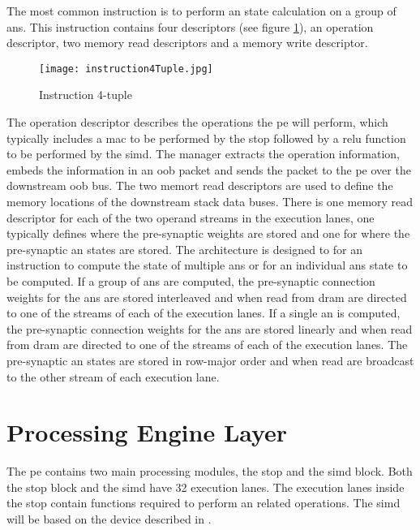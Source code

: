 The most common instruction is to perform \ac{an} state calculation on a group of \acp{an}.
This instruction contains four descriptors (see figure \ref{fig:Instruction 4-tuple}), an operation descriptor, two memory read descriptors and a memory write descriptor.
\begin{figure}[!t]
\centering
\captionsetup{justification=centering}
\captionsetup{width=.9\linewidth}
\centerline{
\mbox{\texttt{[image: instruction4Tuple.jpg]}}
}
\caption{Instruction 4-tuple}
\label{fig:Instruction 4-tuple}
\end{figure}


The operation descriptor describes the operations the \ac{pe} will perform, which typically includes a \ac{mac} to be performed by the \ac{stop} followed by a \ac{relu} function to be performed by the \ac{simd}.
The manager extracts the operation information, embeds the information in an \ac{oob} packet and sends the packet to the \ac{pe} over the downstream \ac{oob} bus.
The two memort read descriptors are used to define the memory locations of the downstream stack data buses. 
There is one memory read descriptor for each of the two operand streams in the execution lanes, one typically defines where the pre-synaptic weights are stored and one for where the pre-synaptic \ac{an} states are stored.
The architecture is designed to for an instruction to compute the state of multiple \acp{an} or for an individual \acp{an} state to be computed.
If a group of \acp{an} are computed, the pre-synaptic connection weights for the \acp{an} are stored interleaved and when read from \ac{dram} are directed to one of the streams of each of the execution lanes.
If a single \ac{an} is computed, the pre-synaptic connection weights for the \acp{an} are stored linearly and when read from \ac{dram} are directed to one of the streams of each of the execution lanes.
The pre-synaptic \ac{an} states are stored in row-major order and when read are broadcast to the other stream of each execution lane.



\section{Processing Engine Layer}
\label{sec:Processing Engine Layer}
The \ac{pe} contains two main processing modules, the \ac{stop} and the \ac{simd} block.
Both the \ac{stop} block and the \ac{simd} have 32 execution lanes. The execution lanes inside the \ac{stop} contain functions required to perform \ac{an} related operations.
The \ac{simd} will be based on the device described in \cite{schabel2014diss}.


